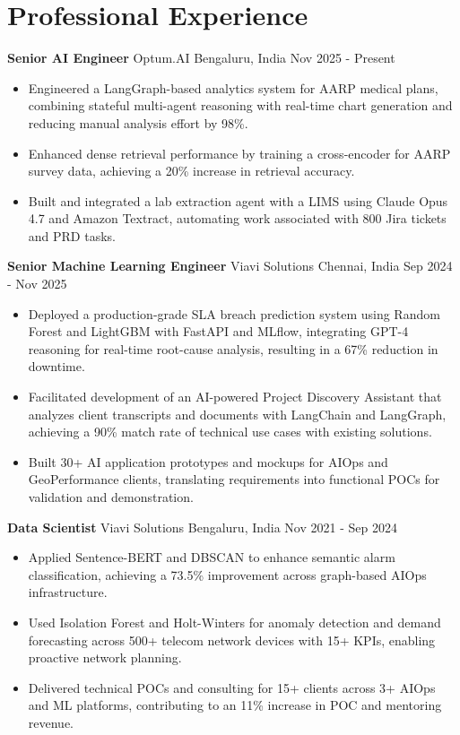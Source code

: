 \documentclass[10pt,a4paper]{article}
\newcommand{\role}[4]{\textbf{#1} \textbar{} #2 \hfill #3 \textbar{} #4\par}
\begin{document}
\section{Professional Experience}
\role{Senior AI Engineer}{Optum.AI}{Bengaluru, India}{Nov 2025 - Present}
\begin{itemize}
  \item Engineered a LangGraph-based analytics system for AARP medical plans, combining stateful multi-agent reasoning with real-time chart generation and reducing manual analysis effort by 98\%.
  \item Enhanced dense retrieval performance by training a cross-encoder for AARP survey data, achieving a 20\% increase in retrieval accuracy.
  \item Built and integrated a lab extraction agent with a LIMS using Claude Opus 4.7 and Amazon Textract, automating work associated with 800 Jira tickets and PRD tasks.
\end{itemize}
\vspace{3pt}
\role{Senior Machine Learning Engineer}{Viavi Solutions}{Chennai, India}{Sep 2024 - Nov 2025}
\begin{itemize}
  \item Deployed a production-grade SLA breach prediction system using Random Forest and LightGBM with FastAPI and MLflow, integrating GPT-4 reasoning for real-time root-cause analysis, resulting in a 67\% reduction in downtime.
  \item Facilitated development of an AI-powered Project Discovery Assistant that analyzes client transcripts and documents with LangChain and LangGraph, achieving a 90\% match rate of technical use cases with existing solutions.
  \item Built 30+ AI application prototypes and mockups for AIOps and GeoPerformance clients, translating requirements into functional POCs for validation and demonstration.
\end{itemize}
\vspace{3pt}
\role{Data Scientist}{Viavi Solutions}{Bengaluru, India}{Nov 2021 - Sep 2024}
\begin{itemize}
  \item Applied Sentence-BERT and DBSCAN to enhance semantic alarm classification, achieving a 73.5\% improvement across graph-based AIOps infrastructure.
  \item Used Isolation Forest and Holt-Winters for anomaly detection and demand forecasting across 500+ telecom network devices with 15+ KPIs, enabling proactive network planning.
  \item Delivered technical POCs and consulting for 15+ clients across 3+ AIOps and ML platforms, contributing to an 11\% increase in POC and mentoring revenue.
\end{itemize}
\end{document}
